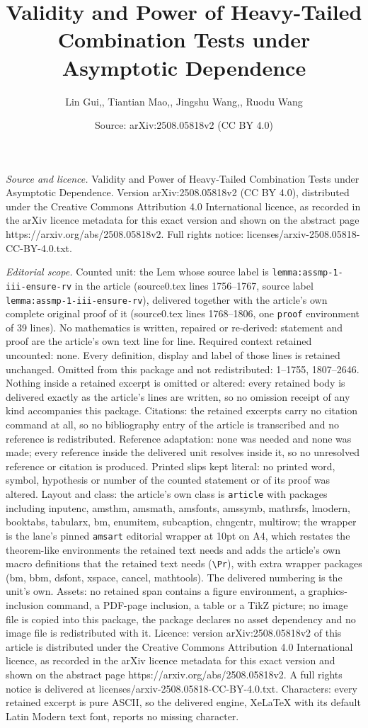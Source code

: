 \documentclass[10pt,a4paper]{amsart}
\title[Validity and Power of Heavy-Tailed Combination Tests under A]{Validity and Power of Heavy-Tailed Combination Tests under Asymptotic Dependence}
\author{Lin Gui,, Tiantian Mao,, Jingshu Wang,, Ruodu Wang}
\date{Source: arXiv:2508.05818v2 (CC BY 4.0)}
\begin{document}
\maketitle

\noindent\emph{Source and licence.} Validity and Power of Heavy-Tailed Combination Tests under Asymptotic Dependence. Version arXiv:2508.05818v2 (CC BY 4.0), distributed under the Creative Commons Attribution 4.0 International licence, as recorded in the arXiv licence metadata for this exact version and shown on the abstract page https://arxiv.org/abs/2508.05818v2. Full rights notice: licenses/arxiv-2508.05818-CC-BY-4.0.txt.\par\smallskip

\noindent\textit{Editorial scope.} Counted unit: the Lem whose source label is \texttt{lemma:assmp-1-iii-ensure-rv} in the article (source0.tex lines 1756--1767, source label \texttt{lemma:assmp-1-iii-ensure-rv}), delivered together with the article's own complete original proof of it (source0.tex lines 1768--1806, one \texttt{proof} environment of 39 lines). No mathematics is written, repaired or re-derived: statement and proof are the article's own text line for line. Required context retained uncounted: none. Every definition, display and label of those lines is retained unchanged. Omitted from this package and not redistributed: 1--1755, 1807--2646. Nothing inside a retained excerpt is omitted or altered: every retained body is delivered exactly as the article's lines are written, so no omission receipt of any kind accompanies this package. Citations: the retained excerpts carry no citation command at all, so no bibliography entry of the article is transcribed and no reference is redistributed. Reference adaptation: none was needed and none was made; every reference inside the delivered unit resolves inside it, so no unresolved reference or citation is produced. Printed slips kept literal: no printed word, symbol, hypothesis or number of the counted statement or of its proof was altered. Layout and class: the article's own class is \texttt{article} with packages including inputenc, amsthm, amsmath, amsfonts, amssymb, mathrsfs, lmodern, booktabs, tabularx, bm, enumitem, subcaption, chngcntr, multirow; the wrapper is the lane's pinned \texttt{amsart} editorial wrapper at 10pt on A4, which restates the theorem-like environments the retained text needs and adds the article's own macro definitions that the retained text needs (\texttt{\textbackslash Pr}), with extra wrapper packages (bm, bbm, dsfont, xspace, cancel, mathtools). The delivered numbering is the unit's own. Assets: no retained span contains a figure environment, a graphics-inclusion command, a PDF-page inclusion, a table or a TikZ picture; no image file is copied into this package, the package declares no asset dependency and no image file is redistributed with it. Licence: version arXiv:2508.05818v2 of this article is distributed under the Creative Commons Attribution 4.0 International licence, as recorded in the arXiv licence metadata for this exact version and shown on the abstract page https://arxiv.org/abs/2508.05818v2. A full rights notice is delivered at licenses/arxiv-2508.05818-CC-BY-4.0.txt. Characters: every retained excerpt is pure ASCII, so the delivered engine, XeLaTeX with its default Latin Modern text font, reports no missing character.
\end{document}
